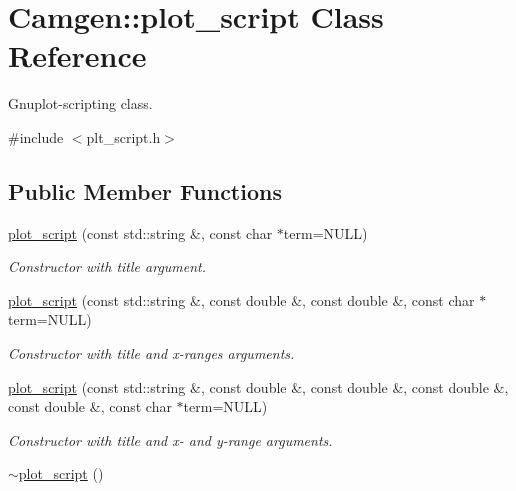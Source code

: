 \hypertarget{a00426}{\section{Camgen\-:\-:plot\-\_\-script Class Reference}
\label{a00426}
}


Gnuplot-\/scripting class.  




{\ttfamily \#include $<$plt\-\_\-script.\-h$>$}

\subsection*{Public Member Functions}
\begin{DoxyCompactItemize}
\item 
\hypertarget{a00426_a3321bcc881f0b6d2994d17a2bf9d605c}{\hyperlink{a00426_a3321bcc881f0b6d2994d17a2bf9d605c}{plot\-\_\-script} (const std\-::string \&, const char $\ast$term=N\-U\-L\-L)}\label{a00426_a3321bcc881f0b6d2994d17a2bf9d605c}

\begin{DoxyCompactList}\small\item\em Constructor with title argument. \end{DoxyCompactList}\item 
\hypertarget{a00426_aac537107f92eddbf96140a66fc624515}{\hyperlink{a00426_aac537107f92eddbf96140a66fc624515}{plot\-\_\-script} (const std\-::string \&, const double \&, const double \&, const char $\ast$term=N\-U\-L\-L)}\label{a00426_aac537107f92eddbf96140a66fc624515}

\begin{DoxyCompactList}\small\item\em Constructor with title and x-\/ranges arguments. \end{DoxyCompactList}\item 
\hypertarget{a00426_a9f13d5b3f88ca653b0b48ee81f03fc4a}{\hyperlink{a00426_a9f13d5b3f88ca653b0b48ee81f03fc4a}{plot\-\_\-script} (const std\-::string \&, const double \&, const double \&, const double \&, const double \&, const char $\ast$term=N\-U\-L\-L)}\label{a00426_a9f13d5b3f88ca653b0b48ee81f03fc4a}

\begin{DoxyCompactList}\small\item\em Constructor with title and x-\/ and y-\/range arguments. \end{DoxyCompactList}\item 
\hypertarget{a00426_a78bf6ba995102d763fe4ee10cd1617e0}{\hyperlink{a00426_a78bf6ba995102d763fe4ee10cd1617e0}{$\sim$plot\-\_\-script} ()}\label{a00426_a78bf6ba995102d763fe4ee10cd1617e0}


\end{DoxyCompactItemize}
